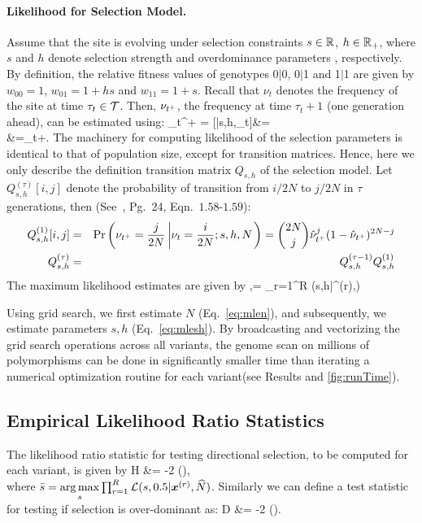 \paragraph{Likelihood for Selection Model.}
Assume that the site is evolving under selection constraints $s\in
{\mathbb R}$, $h\in {\mathbb R}_+$, where $s$ and $h$ denote selection strength and 
overdominance parameters ,
respectively. By definition, the relative fitness values of genotypes
0$|$0, 0$|$1 and 1$|$1 are given by $w_{00}=1$, $w_{01}=1+hs$ and
$w_{11}=1+s$. Recall that $\nu_t$ denotes the frequency of the site at
time $\tau_t\in {\cal T}$. Then, $\nu_{t^+}$, the frequency at time
$\tau_{t}+1$ (one generation ahead), can be estimated using: 
\beq 
\hat{\nu}_{t^+} =
[\nusp|s,h,\nu_t]&=\\
&=\nu_t+.
  \label{eq:transition}
\eeq
The machinery for computing likelihood of the selection parameters is 
identical to that of population size, except for transition matrices. Hence, here 
we only describe the definition transition matrix $Q_{s,h}$ of the selection 
model.
Let $Q^{(\tau)}_{s,h}[i,j]$ denote the
probability of transition from ${i}/{2N}$ to ${j}/{2N}$ in
$\tau$ generations, then (See~\cite{Ewens2012Mathematical}, Pg.~24, 
Eqn.~$1.58$-$1.59$):
\begin{eqnarray}
  Q^{(1)}_{s,h}[i,j] &=& \operatorname{Pr}\left(\nu_{t^+}=\frac{j}{2N} \left\lvert
      \nu_{t}=\frac{i}{2N};s,h,N \right .\right)={2N \choose j}
  \hat{\nu}_{t^+}^{j} (1-\hat{\nu}_{t^+})^{2N-j}\label{eq:Q1}\\
  Q^{(\tau)}_{s,h} &=& Q^{(\tau-1)}_{s,h}Q^{(1)}_{s,h}\label{eq:Qt}
  \label{eq:mkvs}   
\end{eqnarray}
The maximum likelihood estimates are given by
\beq
\hs,\hh =  \prod_{r=1}^R \Lc(s,h|^{(r)},\hN) 
\label{eq:mlesh}
\eeq

Using grid search, we first estimate $N$ (Eq.~\ref{eq:mlen}), and
subsequently, we estimate parameters $s,h$ (Eq.~\ref{eq:mlesh}). By
broadcasting and vectorizing the grid search operations across all
variants, the genome scan on millions of polymorphisms can be done in
significantly smaller time than iterating a numerical optimization
routine for each variant(see Results and \ref{fig:runTime}).
\subsection{Empirical Likelihood Ratio Statistics}
The  likelihood
ratio statistic for testing directional selection, to be computed for each variant, 
is given by
\beq
	H &= -2 \log 
	\left(\right),\\
	\label{eq:ELRS}
\eeq
where $\bar{s} = \underset{s}{\arg \max} \prod_{r=1}^R 
 {\cal L}(s,0.5|\bm{x}^{(r)},\widehat{N})$. Similarly we can define a test statistic for testing if selection is over-dominant as:
\beq
 D &= -2 \log 
 \left(\right).
 \eeq





